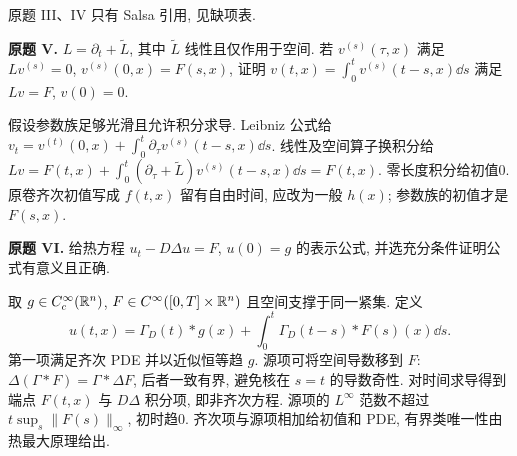 原题 III、IV 只有 Salsa 引用, 见缺项表.
\begin{exercise}\label{ps:3V}
\textbf{原题 V.} $L=\partial_t+\widetilde L$, 其中 $\widetilde L$ 线性且仅作用于空间. 若 $v^{(s)}(\tau,x)$ 满足 $Lv^{(s)}=0$, $v^{(s)}(0,x)=F(s,x)$, 证明 $v(t,x)=\int_0^tv^{(s)}(t-s,x)\dd s$ 满足 $Lv=F$, $v(0)=0$.
\end{exercise}
\begin{solution}
假设参数族足够光滑且允许积分求导. Leibniz 公式给 $v_t=v^{(t)}(0,x)+\int_0^t\partial_\tau v^{(s)}(t-s,x)\dd s$. 线性及空间算子换积分给 $Lv=F(t,x)+\int_0^t(\partial_\tau+\widetilde L)v^{(s)}(t-s,x)\dd s=F(t,x)$. 零长度积分给初值0. 原卷齐次初值写成 $f(t,x)$ 留有自由时间, 应改为一般 $h(x)$; 参数族的初值才是 $F(s,x)$.
\end{solution}
\begin{exercise}\label{ps:3VI}
\textbf{原题 VI.} 给热方程 $u_t-D\Delta u=F$, $u(0)=g$ 的表示公式, 并选充分条件证明公式有意义且正确.
\end{exercise}
\begin{solution}
取 $g\in C_c^\infty(\mathbb R^n)$, $F\in C^\infty([0,T]\times\mathbb R^n)$ 且空间支撑于同一紧集. 定义
\[
u(t,x)=\Gamma_D(t)*g(x)+\int_0^t\Gamma_D(t-s)*F(s)(x)\dd s.
\]
第一项满足齐次 PDE 并以近似恒等趋 $g$. 源项可将空间导数移到 $F$: $\Delta(\Gamma*F)=\Gamma*\Delta F$, 后者一致有界, 避免核在 $s=t$ 的导数奇性. 对时间求导得到端点 $F(t,x)$ 与 $D\Delta$ 积分项, 即非齐次方程. 源项的 $L^\infty$ 范数不超过 $t\sup_s\|F(s)\|_\infty$, 初时趋0. 齐次项与源项相加给初值和 PDE, 有界类唯一性由热最大原理给出.
\end{solution}
